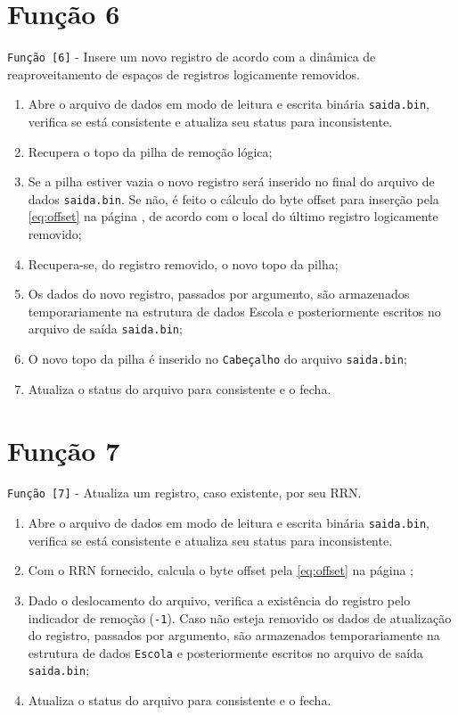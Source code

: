 \documentclass[
	12pt,				%
	openany,			%
	twoside,			%
	a4paper,			%
	english,			%
	french,				%
	spanish,			%
	brazil,				%
]{abntex2}
\begin{document}
	\section{Função 6}

		\verb|Função [6]| - Insere um novo registro de acordo com a dinâmica de reaproveitamento de espaços de registros logicamente removidos.

		\begin{enumerate}
			\item Abre o arquivo de dados em modo de leitura e escrita binária \verb|saida.bin|, verifica se está consistente e atualiza seu status para inconsistente.
			\item Recupera o topo da pilha de remoção lógica;
			\item Se a pilha estiver vazia o novo registro será inserido no final do arquivo de dados \verb|saida.bin|. Se não, é feito o cálculo do byte offset para inserção pela \autoref{eq:offset} na página \pageref{eq:offset}, de acordo com o local do último registro logicamente removido;
			\item Recupera-se, do registro removido, o novo topo da pilha;
			\item Os dados do novo registro, passados por argumento, são armazenados temporariamente na estrutura de dados Escola e posteriormente escritos no arquivo de saída \verb|saida.bin|;
			\item O novo topo da pilha é inserido no \verb|Cabeçalho| do arquivo \verb|saida.bin|;
			\item Atualiza o status do arquivo para consistente e o fecha.
		\end{enumerate}

	\section{Função 7}

		\verb|Função [7]| - Atualiza um registro, caso existente, por seu RRN.

		\begin{enumerate}
			\item Abre o arquivo de dados em modo de leitura e escrita binária \verb|saida.bin|, verifica se está consistente e atualiza seu status para inconsistente.
			\item Com o RRN fornecido, calcula o byte offset pela \autoref{eq:offset} na página \pageref{eq:offset};
			\item Dado o deslocamento do arquivo, verifica a existência do registro pelo indicador de remoção (\verb|-1|). Caso não esteja removido os dados de atualização do registro, passados por argumento, são armazenados temporariamente na estrutura de dados \verb|Escola| e posteriormente escritos no arquivo de saída \verb|saida.bin|;
			\item Atualiza o status do arquivo para consistente e o fecha.
		\end{enumerate}
\end{document}
